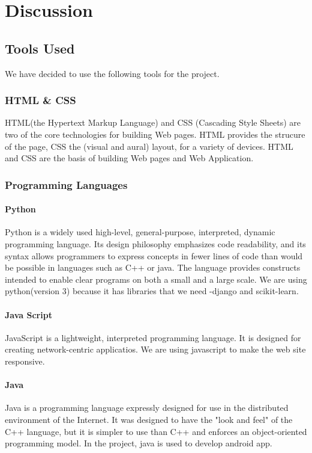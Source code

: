 \documentclass[12ptpt,a4paper]{article}
\begin{document}
	\newpage	
	\section{Discussion}
	\subsection{Tools Used}
		We have decided to use the following tools for the project.		
			\subsubsection{HTML \& CSS}HTML(the Hypertext Markup Language) and CSS (Cascading Style Sheets) are two of the core technologies for building Web pages. HTML provides the strucure of the page, CSS the (visual and aural) layout, for a variety of devices. HTML and CSS are the basis of building Web pages and Web Application\cite{html}.
			\subsubsection{Programming Languages}
				\paragraph{Python}Python is a widely used high-level, general-purpose, interpreted, dynamic programming language. Its design philosophy emphasizes code readability, and its syntax allows programmers to express concepts in fewer lines of code than would be possible in languages such as C++ or java. The language provides constructs intended to enable clear programs on both a small and a large scale\cite{python}. We are using python(version 3) because it has libraries that we need -django and scikit-learn.
				\paragraph{Java Script}JavaScript is a lightweight, interpreted programming language. It is designed for creating network-centric applicatios\cite{javascript}. We are using javascript to make the web site responsive.
				\paragraph{Java}Java is a programming language expressly designed for use in the distributed environment of the Internet. It was designed to have the "look and feel" of the C++ language, but it is simpler to use than C++ and enforces an object-oriented programming model\cite{java}. In the project, java is used to develop android app.
\end{document}
